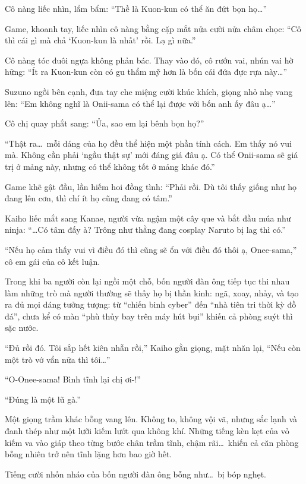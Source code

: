 \documentclass[../main.tex]{subfiles}
\begin{document}
Cô nàng liếc nhìn, lẩm bẩm: ``Thề là Kuon-kun có thể ăn đứt bọn họ\dots''

Game, khoanh tay, liếc nhìn cô nàng bằng cặp mắt nửa cười nửa châm chọc: ``Cô thì cái gì mà chả `Kuon-kun là nhất' rồi. Lạ gì nữa.''

Cô nàng tóc đuôi ngựa không phản bác. Thay vào đó, cô rướn vai, nhún vai hờ hững: ``Ít ra Kuon-kun còn có gu thẩm mỹ hơn là bốn cái đứa đực rựa này\dots''

Suzuno ngồi bên cạnh, đưa tay che miệng cười khúc khích, giọng nhỏ nhẹ vang lên: ``Em không nghĩ là Onii-sama có thể lại được với bốn anh ấy đâu ạ\dots''

Cô chị quay phắt sang: ``Ủa, sao em lại bênh bọn họ?''

``Thật ra\dots\ mỗi dáng của họ đều thể hiện một phần tính cách. Em thấy nó vui mà. Không cần phải `ngầu thật sự' mới đáng giá đâu ạ. Có thể Onii-sama sẽ giá trị ở mảng này, nhưng có thể không tốt ở mảng khác đó.''

Game khẽ gật đầu, lần hiếm hoi đồng tình: ``Phải rồi. Dù tôi thấy giống như họ đang lên cơn, thì chí ít họ cũng đang có tâm.''

Kaiho liếc mắt sang Kanae, người vừa ngậm một cây que và bắt đầu múa như ninja: ``\dots Có tâm đấy à? Trông như thằng đang cosplay Naruto bị lag thì có.''

``Nếu họ cảm thấy vui vì điều đó thì cũng sẽ ổn với điều đó thôi ạ, Onee-sama,'' cô em gái của cô kết luận.

Trong khi ba người còn lại ngồi một chỗ, bốn người đàn ông tiếp tục thi nhau làm những trò mà người thường sẽ thấy họ bị thần kinh: ngã, xoay, nhảy, và tạo ra đủ mọi dáng tưởng tượng: từ ``chiến binh cyber'' đến ``nhà tiên tri thời kỳ đồ đá'', chưa kể có màn ``phù thủy bay trên máy hút bụi'' khiến cả phòng suýt thì sặc nước.

``Đủ rồi đó. Tôi sắp hết kiên nhẫn rồi,'' Kaiho gằn giọng, mặt nhăn lại, ``Nếu còn một trò vớ vẩn nữa thì tôi\dots''

``O-Onee-sama! Bình tĩnh lại chị ơi-!''

``Đúng là một lũ gà.''

Một giọng trầm khác bỗng vang lên. Không to, không vội vã, nhưng sắc lạnh và đanh thép như một lưỡi kiếm lướt qua không khí. Những tiếng kèn kẹt của vỏ kiếm va vào giáp theo từng bước chân trầm tĩnh, chậm rãi\dots\ khiến cả căn phòng bỗng nhiên trở nên tĩnh lặng hơn bao giờ hết.

Tiếng cười nhốn nháo của bốn người đàn ông bỗng như\dots\ bị bóp nghẹt.
\end{document}
